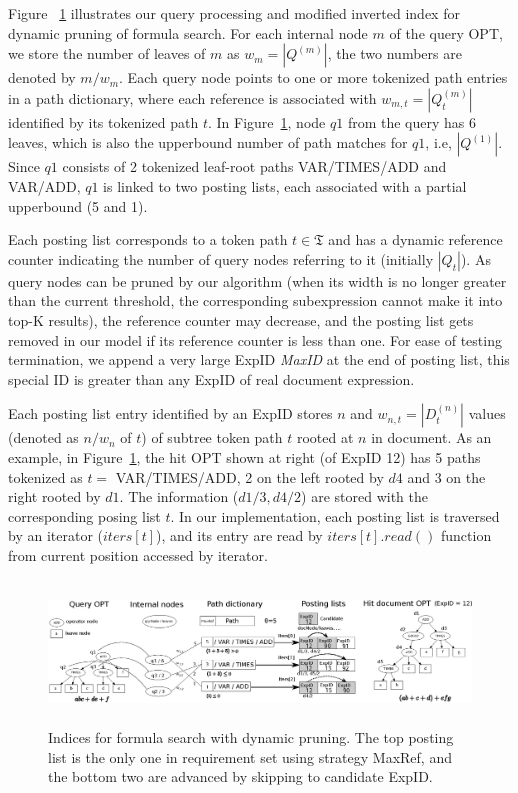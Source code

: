 \documentclass[runningheads]{llncs}
\begin{document}
Figure ~\ref{figillu} illustrates our query processing and modified inverted index for dynamic pruning of formula search.
For each internal node $m$ of the query OPT, we store the number of leaves of $m$  as $w_m = |Q^{(m)}|$, the two numbers are denoted by $m/w_m$.
Each query node points to one or more tokenized path entries in a  path dictionary,
where each reference is associated with $w_{m,t} = |Q^{(m)}_t|$ identified by its tokenized path $t$.
%
In Figure~\ref{figillu}, node $q1$ from the query has 6 leaves, which is also the upperbound number of path matches for $q1$, i.e, $|Q^{(1)}|$.
Since $q1$ consists of 2 tokenized leaf-root paths VAR/TIMES/ADD and VAR/ADD,
$q1$ is linked to two posting lists, each associated with a partial upperbound (5 and 1).

Each posting list corresponds to a token path $t \in \mathfrak{T}$ and has a dynamic reference counter indicating the number of query nodes referring to it (initially $|Q_t|$).
As query nodes can be pruned by our algorithm (when its width is no longer greater than the current threshold, the corresponding subexpression cannot make it into top-K results),
the reference counter may decrease, and the posting list gets removed in our model if its reference counter is less than one.
% 
For ease of testing termination, we append a very large ExpID \emph{MaxID} at the end of posting list, this special ID is greater than any ExpID of real document expression.

Each posting list entry identified by an ExpID stores $n$ and $w_{n,t} = |D^{(n)}_t|$ values (denoted as $n/w_n$ of $t$) of subtree token path $t$ rooted at $n$ in document.
%
As an example, in Figure~\ref{figillu}, the hit OPT shown at right (of ExpID 12) has 5 paths tokenized as $t =$ VAR/TIMES/ADD, 2 on the left rooted by $d4$ and 3 on the right rooted by $d1$. The information ($d1/3, d4/2$) are stored with the corresponding posing list $t$.
In our implementation, each posting list is traversed by an iterator ($iters[t]$), and its entry are read by $iters[t].read()$ function from current position accessed by iterator.

\begin{figure}[!t]
\begin{center}
\hspace*{-0.6in}\includegraphics[height=1.5in]{fig/drawing.eps}
\caption{Indices for formula search with dynamic pruning. The top posting list is the only one in requirement set using strategy MaxRef, and the bottom two are advanced by skipping to candidate ExpID.}
\label{figillu}
\end{center}
\end{figure}
\end{document}
